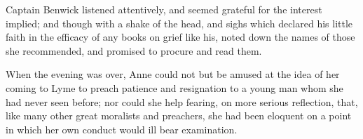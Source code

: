 Captain Benwick listened attentively, and seemed grateful for the interest implied; and though with a shake of the head, and sighs which declared his little faith in the efficacy of any books on grief like his, noted down the names of those she recommended, and promised to procure and read them.

When the evening was over, Anne could not but be amused at the idea of her coming to Lyme to preach patience and resignation to a young man whom she had never seen before; nor could she help fearing, on more serious reflection, that, like many other great moralists and preachers, she had been eloquent on a point in which her own conduct would ill bear examination.